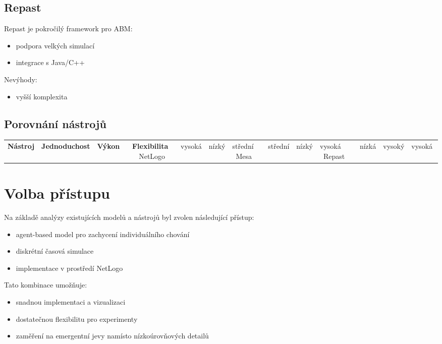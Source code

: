\subsection{Repast}

Repast je pokročilý framework pro ABM:

\begin{itemize}
\item podpora velkých simulací
\item integrace s Java/C++
\end{itemize}

Nevýhody:
\begin{itemize}
\item vyšší komplexita
\end{itemize}

\subsection{Porovnání nástrojů}

\begin{center}
\begin{tabular}{lccc}
\textbf{Nástroj} & \textbf{Jednoduchost} & \textbf{Výkon} & \textbf{Flexibilita} \
NetLogo & vysoká & nízký & střední \
Mesa & střední & nízký & vysoká \
Repast & nízká & vysoký & vysoká \
\end{tabular}
\end{center}

\section{Volba přístupu}

Na základě analýzy existujících modelů a nástrojů byl zvolen následující přístup:

\begin{itemize}
\item agent-based model pro zachycení individuálního chování
\item diskrétní časová simulace
\item implementace v prostředí NetLogo
\end{itemize}

Tato kombinace umožňuje:

\begin{itemize}
\item snadnou implementaci a vizualizaci
\item dostatečnou flexibilitu pro experimenty
\item zaměření na emergentní jevy namísto nízkoúrovňových detailů
\end{itemize}

